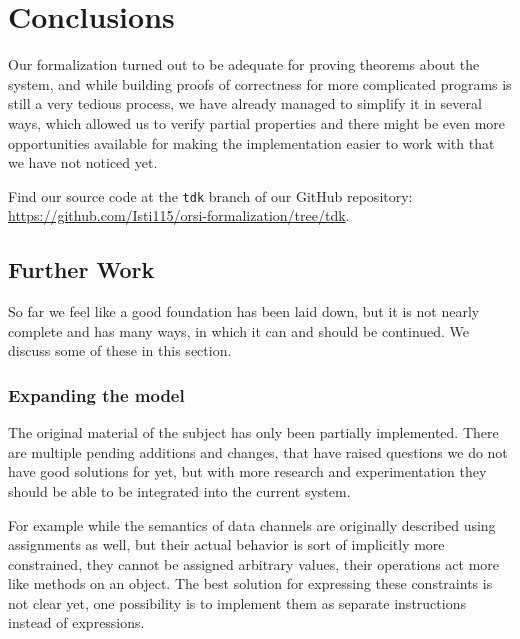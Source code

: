 \chapter{Conclusions}
\label{chp:conclusions}

Our formalization turned out to be adequate for proving theorems about the system, and while building proofs of correctness for more complicated programs is still a very tedious process, we have already managed to simplify it in several ways, which allowed us to verify partial properties and there might be even more opportunities available for making the implementation easier to work with that we have not noticed yet.

Find our source code at the \verb|tdk| branch of our GitHub repository: \url{https://github.com/Isti115/orsi-formalization/tree/tdk}.

\section{Further Work}

So far we feel like a good foundation has been laid down, but it is not nearly complete and has many ways, in which it can and should be continued. We discuss some of these in this section.

\subsection{Expanding the model}

The original material of the subject has only been partially implemented. There are multiple pending additions and changes, that have raised questions we do not have good solutions for yet, but with more research and experimentation they should be able to be integrated into the current system.

For example while the semantics of data channels are originally described using assignments as well, but their actual behavior is sort of implicitly more constrained, they cannot be assigned arbitrary values, their operations act more like methods on an object. The best solution for expressing these constraints is not clear yet, one possibility is to implement them as separate instructions instead of expressions.

